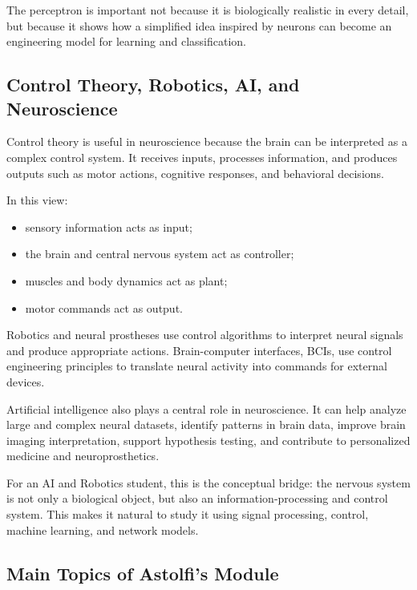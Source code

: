 \begin{authornote}
The perceptron is important not because it is biologically realistic in every detail, but because it shows how a simplified idea inspired by neurons can become an engineering model for learning and classification.
\end{authornote}

\subsection{Control Theory, Robotics, AI, and Neuroscience}

Control theory is useful in neuroscience because the brain can be interpreted as a complex control system. It receives inputs, processes information, and produces outputs such as motor actions, cognitive responses, and behavioral decisions.

In this view:

\begin{itemize}[noitemsep]
    \item sensory information acts as input;
    \item the brain and central nervous system act as controller;
    \item muscles and body dynamics act as plant;
    \item motor commands act as output.
\end{itemize}

Robotics and neural prostheses use control algorithms to interpret neural signals and produce appropriate actions. Brain-computer interfaces, BCIs, use control engineering principles to translate neural activity into commands for external devices.

Artificial intelligence also plays a central role in neuroscience. It can help analyze large and complex neural datasets, identify patterns in brain data, improve brain imaging interpretation, support hypothesis testing, and contribute to personalized medicine and neuroprosthetics.

\begin{authornote}
For an AI and Robotics student, this is the conceptual bridge: the nervous system is not only a biological object, but also an information-processing and control system. This makes it natural to study it using signal processing, control, machine learning, and network models.
\end{authornote}

\subsection{Main Topics of Astolfi's Module}

